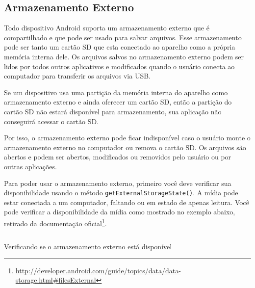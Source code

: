 \documentclass[a4paper,12pt,brazil]{book}
\begin{document}
\begin{singlespace}

		\section{Armazenamento Externo}

		Todo dispositivo Android suporta um armazenamento externo que é compartilhado e que pode ser usado para salvar arquivos. Esse armazenamento pode ser tanto um cartão SD que esta conectado ao aparelho como a própria memória interna dele. Os arquivos salvos no armazenamento externo podem ser lidos por todos outros aplicativos e modificados quando o usuário conecta ao computador para transferir os arquivos via USB.

		Se um dispositivo usa uma partição da memória interna do aparelho como armazenamento externo e ainda oferecer um cartão SD, então a partição do cartão SD não estará disponível para armazenamento, sua aplicação não conseguirá acessar o cartão SD. 

		Por isso, o armazenamento externo pode ficar indisponível caso o usuário monte o armazenamento externo no computador ou remova o cartão SD. Os arquivos são abertos e podem ser abertos, modificados ou removidos pelo usuário ou por outras aplicações.

		Para poder usar o armazenamento externo, primeiro você deve verificar sua disponibilidade usando o método \texttt{getExternalStorageState()}. A mídia pode estar conectada a um computador, faltando ou em estado de apenas leitura. Você pode verificar a disponibilidade da mídia como mostrado no exemplo abaixo, retirado da documentação oficial\footnote{\href{http://developer.android.com/guide/topics/data/data-storage.html\#filesExternal}{http://developer.android.com/guide/topics/data/data-storage.html\#filesExternal}}.

		\begin{listing}[H]
		\inputminted[linenos=true,fontsize=\small,frame=lines, framesep=2mm, tabsize=2,numbersep=5pt]{java}{src/api/storage/external1.java}
		\caption{Verificando se o armazenamento externo está disponível}
		\label{code:external1}
		\end{listing} 	


\end{singlespace}
\end{document}
